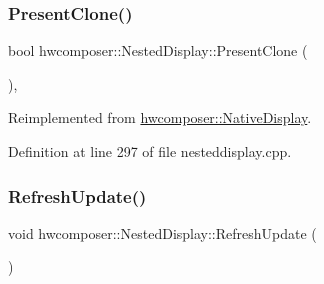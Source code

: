 \mbox{\label{classhwcomposer_1_1NestedDisplay_ae78bf526c8b23585edffc5e1d306647d}} 
\subsubsection{\texorpdfstring{Present\+Clone()}{PresentClone()}}
{\footnotesize\ttfamily bool hwcomposer\+::\+Nested\+Display\+::\+Present\+Clone (\begin{DoxyParamCaption}\item[{\mbox{\hyperlink{classhwcomposer_1_1NativeDisplay}{Native\+Display}} $\ast$}]{ }\end{DoxyParamCaption})\hspace{0.3cm}{\ttfamily [override]}, {\ttfamily [virtual]}}



Reimplemented from \mbox{\hyperlink{classhwcomposer_1_1NativeDisplay_ae031f7f90f8a4ab3fba24a31c4cc6b74}{hwcomposer\+::\+Native\+Display}}.



Definition at line 297 of file nesteddisplay.\+cpp.


\begin{DoxyCode}{0}
\end{DoxyCode}
\mbox{\label{classhwcomposer_1_1NestedDisplay_aec45c2f726c5a38a918a806b524530b1}} 
\subsubsection{\texorpdfstring{Refresh\+Update()}{RefreshUpdate()}}
{\footnotesize\ttfamily void hwcomposer\+::\+Nested\+Display\+::\+Refresh\+Update (\begin{DoxyParamCaption}{ }\end{DoxyParamCaption})}



